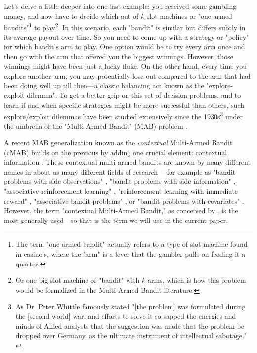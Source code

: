 \documentclass{jss}\usepackage[]{graphicx}\usepackage[]{color}
\begin{document}
Let's delve a little deeper into one last example: you received some gambling money, and now have to decide which out of $k$ slot machines or "one-armed bandits"\footnote{The term "one-armed bandit" actually refers to a type of slot machine found in casino's, where the "arm" is a lever that the gambler pulls on feeding it a quarter.} to play\footnote{Or one big slot machine or "bandit" with $k$ arms, which is how this problem would be formalized in the Multi-Armed Bandit literature.}. In this scenario, each "bandit" is similar but differs subtly in its average payout over time. So you need to come up with a strategy or "policy" for which bandit's arm to play. One option would be to try every arm once and then go with the arm that offered you the biggest winnings. However, those winnings might have been just a lucky fluke. On the other hand, every time you explore another arm, you may potentially lose out compared to the arm that had been doing well up till then---a classic balancing act known as the "explore-exploit dilemma". To get a better grip on this set of decision problems, and to learn if and when specific strategies might be more successful than others, such explore/exploit dilemmas have been studied extensively since the 1930s\footnote{As Dr. Peter Whittle famously stated "[the problem] was formulated during the [second world] war, and efforts to solve it so sapped the energies and minds of Allied analysts that the suggestion was made that the problem be dropped over Germany, as the ultimate instrument of intellectual sabotage." \citep{Whittle1979}} under the umbrella of the "Multi-Armed Bandit" (MAB) problem \citep{Auer2002,Lai1985,Bubeck2012}. %

A recent MAB generalization known as the \textit{contextual} Multi-Armed Bandit (cMAB) builds on the previous by adding one crucial element: contextual information \citep{Langford2008}. These contextual multi-armed bandits are known by many different names in about as many different fields of research \citep{Tewari2017}---for example as "bandit problems with side observations" \citep{Wang2005a}, "bandit problems with side information" \citep{Lu2010}, "associative reinforcement learning" \citep{Kaelbling1996}, "reinforcement learning with immediate reward" \citep{Abe2003}, "associative bandit problems" \citep{Strehl2006}, or "bandit problems with covariates" \citep{Sarkar1991}. However, the term "contextual Multi-Armed Bandit," as conceived by \cite{Langford2008}, is the most generally used---so that is the term we will use in the current paper.
\end{document}
